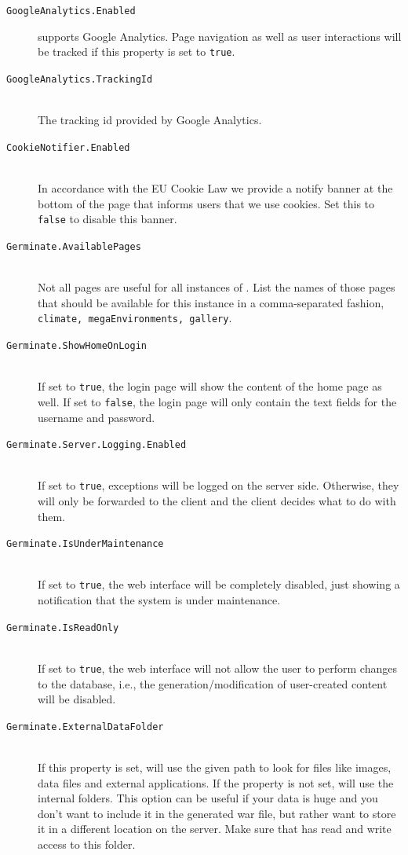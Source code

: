 \begin{description}
    \item[\texttt{GoogleAnalytics.Enabled}]  supports Google Analytics. Page navigation as well as user interactions will be tracked if this property is set to \texttt{true}.
    \item[\texttt{GoogleAnalytics.TrackingId}\nonoptionalif] \floatright{[String]}\\ The tracking id provided by Google Analytics.
    \item[\texttt{CookieNotifier.Enabled}] \\ In accordance with the EU Cookie Law \cite{CookieLaw} we provide a notify banner at the bottom of the page that informs users that we use cookies. Set this to \texttt{false} to disable this banner.
    \item[\texttt{Germinate.AvailablePages}\nonoptional] \floatright{[CSV]}\\Not all pages are useful for all instances of {\germinate}. List the names of those pages that should be available for this instance in a comma-separated fashion, \eg \texttt{climate, megaEnvironments, gallery}.
    \item[\texttt{Germinate.ShowHomeOnLogin}] \\If set to \texttt{true}, the login page will show the content of the home page as well. If set to \texttt{false}, the login page will only contain the text fields for the username and password.
    \item[\texttt{Germinate.Server.Logging.Enabled}] \\If set to \texttt{true}, exceptions will be logged on the server side. Otherwise, they will only be forwarded to the client and the client decides what to do with them.
    \item[\texttt{Germinate.IsUnderMaintenance}] \\If set to \texttt{true}, the web interface will be completely disabled, just showing a notification that the system is under maintenance.
    \item[\texttt{Germinate.IsReadOnly}] \\If set to \texttt{true}, the web interface will not allow the user to perform changes to the database, i.e., the generation/modification of user-created content will be disabled.
    \item[\texttt{Germinate.ExternalDataFolder}\nonoptionalif] \floatright{[Path]}\\If this property is set, {\germinate} will use the given path to look for files like images, data files and external applications. If the property is not set, {\germinate} will use the internal folders. This option can be useful if your data is huge and you don't want to include it in the generated war file, but rather want to store it in a different location on the server. Make sure that {\germinate} has read and write access to this folder.

\end{description}
